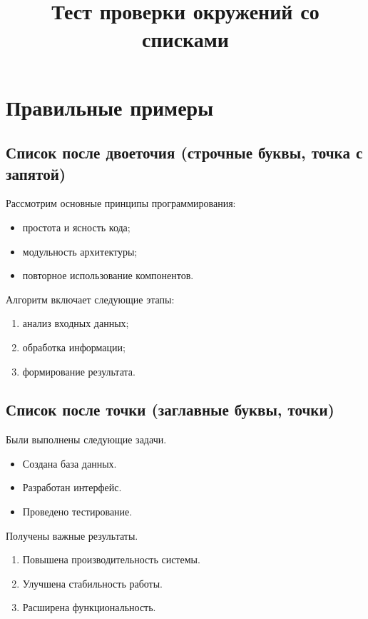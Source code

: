 \documentclass{article}
\begin{document}
\title{Тест проверки окружений со списками}
\maketitle

\section{Правильные примеры}

\subsection{Список после двоеточия (строчные буквы, точка с запятой)}

Рассмотрим основные принципы программирования:
\begin{itemize}
\item простота и ясность кода;
\item модульность архитектуры;
\item повторное использование компонентов.
\end{itemize}

Алгоритм включает следующие этапы:
\begin{enumerate}
\item анализ входных данных;
\item обработка информации;
\item формирование результата.
\end{enumerate}

\subsection{Список после точки (заглавные буквы, точки)}

Были выполнены следующие задачи.
\begin{itemize}
\item Создана база данных.
\item Разработан интерфейс.
\item Проведено тестирование.
\end{itemize}

Получены важные результаты.
\begin{enumerate}
\item Повышена производительность системы.
\item Улучшена стабильность работы.
\item Расширена функциональность.
\end{enumerate}
\end{document}
